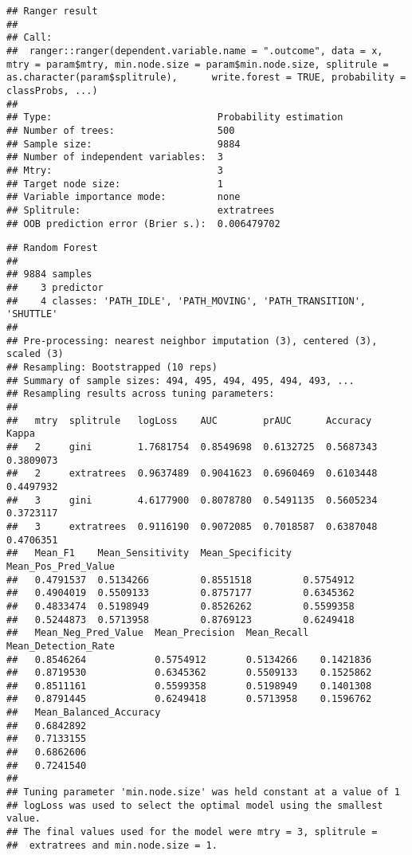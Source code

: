 \documentclass[]{article}
\begin{document}
\begin{verbatim}
## Ranger result
## 
## Call:
##  ranger::ranger(dependent.variable.name = ".outcome", data = x,      mtry = param$mtry, min.node.size = param$min.node.size, splitrule = as.character(param$splitrule),      write.forest = TRUE, probability = classProbs, ...) 
## 
## Type:                             Probability estimation 
## Number of trees:                  500 
## Sample size:                      9884 
## Number of independent variables:  3 
## Mtry:                             3 
## Target node size:                 1 
## Variable importance mode:         none 
## Splitrule:                        extratrees 
## OOB prediction error (Brier s.):  0.006479702
\end{verbatim}

\begin{verbatim}
## Random Forest 
## 
## 9884 samples
##    3 predictor
##    4 classes: 'PATH_IDLE', 'PATH_MOVING', 'PATH_TRANSITION', 'SHUTTLE' 
## 
## Pre-processing: nearest neighbor imputation (3), centered (3), scaled (3) 
## Resampling: Bootstrapped (10 reps) 
## Summary of sample sizes: 494, 495, 494, 495, 494, 493, ... 
## Resampling results across tuning parameters:
## 
##   mtry  splitrule   logLoss    AUC        prAUC      Accuracy   Kappa    
##   2     gini        1.7681754  0.8549698  0.6132725  0.5687343  0.3809073
##   2     extratrees  0.9637489  0.9041623  0.6960469  0.6103448  0.4497932
##   3     gini        4.6177900  0.8078780  0.5491135  0.5605234  0.3723117
##   3     extratrees  0.9116190  0.9072085  0.7018587  0.6387048  0.4706351
##   Mean_F1    Mean_Sensitivity  Mean_Specificity  Mean_Pos_Pred_Value
##   0.4791537  0.5134266         0.8551518         0.5754912          
##   0.4904019  0.5509133         0.8757177         0.6345362          
##   0.4833474  0.5198949         0.8526262         0.5599358          
##   0.5244873  0.5713958         0.8769123         0.6249418          
##   Mean_Neg_Pred_Value  Mean_Precision  Mean_Recall  Mean_Detection_Rate
##   0.8546264            0.5754912       0.5134266    0.1421836          
##   0.8719530            0.6345362       0.5509133    0.1525862          
##   0.8511161            0.5599358       0.5198949    0.1401308          
##   0.8791445            0.6249418       0.5713958    0.1596762          
##   Mean_Balanced_Accuracy
##   0.6842892             
##   0.7133155             
##   0.6862606             
##   0.7241540             
## 
## Tuning parameter 'min.node.size' was held constant at a value of 1
## logLoss was used to select the optimal model using the smallest value.
## The final values used for the model were mtry = 3, splitrule =
##  extratrees and min.node.size = 1.
\end{verbatim}
\end{document}

